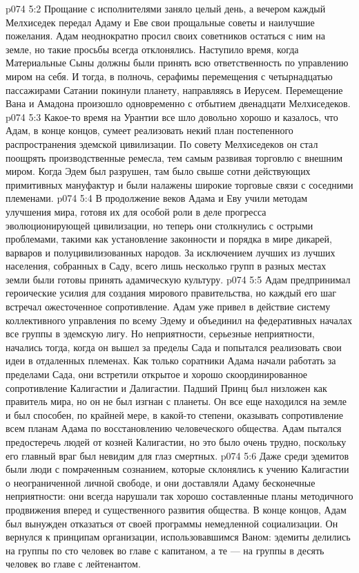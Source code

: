 \vs p074 5:2 Прощание с исполнителями заняло целый день, а вечером каждый Мелхиседек передал Адаму и Еве свои прощальные советы и наилучшие пожелания. Адам неоднократно просил своих советников остаться с ним на земле, но такие просьбы всегда отклонялись. Наступило время, когда Материальные Сыны должны были принять всю ответственность по управлению миром на себя. И тогда, в полночь, серафимы перемещения с четырнадцатью пассажирами Сатании покинули планету, направляясь в Иерусем. Перемещение Вана и Амадона произошло одновременно с отбытием двенадцати Мелхиседеков.
\vs p074 5:3 \pc Какое\hyp{}то время на Урантии все шло довольно хорошо и казалось, что Адам, в конце концов, сумеет реализовать некий план постепенного распространения эдемской цивилизации. По совету Мелхиседеков он стал поощрять производственные ремесла, тем самым развивая торговлю с внешним миром. Когда Эдем был разрушен, там было свыше сотни действующих примитивных мануфактур и были налажены широкие торговые связи с соседними племенами.
\vs p074 5:4 В продолжение веков Адама и Еву учили методам улучшения мира, готовя их для особой роли в деле прогресса эволюционирующей цивилизации, но теперь они столкнулись с острыми проблемами, такими как установление законности и порядка в мире дикарей, варваров и полуцивилизованных народов. За исключением лучших из лучших населения, собранных в Саду, всего лишь несколько групп в разных местах земли были готовы принять адамическую культуру.
\vs p074 5:5 Адам предпринимал героические усилия для создания мирового правительства, но каждый его шаг встречал ожесточенное сопротивление. Адам уже привел в действие систему коллективного управления по всему Эдему и объединил на федеративных началах все группы в эдемскую лигу. Но неприятности, серьезные неприятности, начались тогда, когда он вышел за пределы Сада и попытался реализовать свои идеи в отдаленных племенах. Как только соратники Адама начали работать за пределами Сада, они встретили открытое и хорошо скоординированное сопротивление Калигастии и Далигастии. Падший Принц был низложен как правитель мира, но он не был изгнан с планеты. Он все еще находился на земле и был способен, по крайней мере, в какой\hyp{}то степени, оказывать сопротивление всем планам Адама по восстановлению человеческого общества. Адам пытался предостеречь людей от козней Калигастии, но это было очень трудно, поскольку его главный враг был невидим для глаз смертных.
\vs p074 5:6 Даже среди эдемитов были люди с помраченным сознанием, которые склонялись к учению Калигастии о неограниченной личной свободе, и они доставляли Адаму бесконечные неприятности: они всегда нарушали так хорошо составленные планы методичного продвижения вперед и существенного развития общества. В конце концов, Адам был вынужден отказаться от своей программы немедленной социализации. Он вернулся к принципам организации, использовавшимся Ваном: эдемиты делились на группы по сто человек во главе с капитаном, а те --- на группы в десять человек во главе с лейтенантом.
